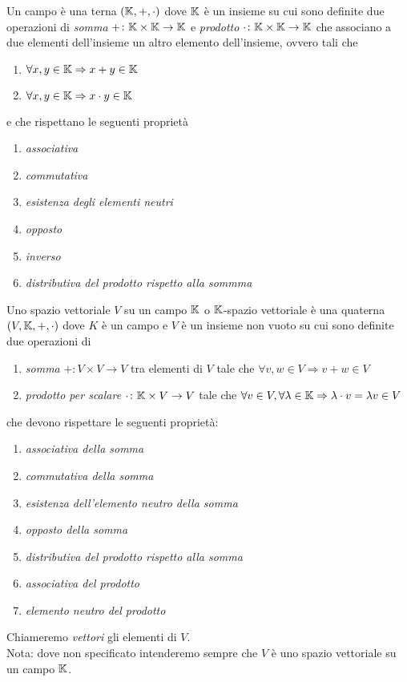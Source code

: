 


\begin{definition}[Campo]
	Un campo è una terna $ (\mathbb{K}, +, \cdot) $ dove $ \mathbb{K} $ è un insieme su cui sono definite due operazioni di \emph{somma} $ + \colon \mathbb{K} \times \mathbb{K} \to \mathbb{K} $ e \emph{prodotto} $ \cdot \colon \mathbb{K} \times \mathbb{K} \to \mathbb{K} $ che associano a due elementi dell'insieme un altro elemento dell'insieme, ovvero tali che
	\begin{enumerate}
		\item $ \forall x, y \in \mathbb{K} \Rightarrow x + y \in \mathbb{K} $
		\item $ \forall x, y \in \mathbb{K} \Rightarrow x \cdot y \in \mathbb{K} $
	\end{enumerate}
	e che rispettano le seguenti proprietà
	\begin{enumerate}[label = (\roman*)]
		\item \emph{associativa}
		\item \emph{commutativa}
		\item \emph{esistenza degli elementi neutri}
		\item \emph{opposto}
		\item \emph{inverso}
		\item \emph{distributiva del prodotto rispetto alla sommma}
	\end{enumerate}
\end{definition}

\begin{definition}
	Uno spazio vettoriale $ V $ su un campo $ \mathbb{K} $ o $ \mathbb{K} $-spazio vettoriale è una quaterna $ (V, \mathbb{K}, +, \cdot) $ dove $ K $ è un campo e $ V $ è un insieme non vuoto su cui sono definite due operazioni di 
	\begin{enumerate}
		\item \emph{somma} $ + \colon V \times V \to V $ tra elementi di $ V $ tale che $ \forall v, w \in V \Rightarrow v + w \in V $
		\item \emph{prodotto per scalare} $ \cdot \colon \mathbb{K} \times V \to V $ tale che $ \forall v \in V, \forall \lambda \in \mathbb{K} \Rightarrow \lambda \cdot v = \lambda v \in V $
	\end{enumerate}
	che devono rispettare le seguenti proprietà:
	\begin{enumerate}[label=(\roman*)]
		\item \emph{associativa della somma}
		\item \emph{commutativa della somma}
		\item \emph{esistenza dell'elemento neutro della somma}
		\item \emph{opposto della somma}
		\item \emph{distributiva del prodotto rispetto alla somma}
		\item \emph{associativa del prodotto}
		\item \emph{elemento neutro del prodotto}
	\end{enumerate}
	Chiameremo \emph{vettori} gli elementi di $ V $. \\
	\textsf{Nota: dove non specificato intenderemo sempre che $ V $ è uno spazio vettoriale su un campo $ \mathbb{K} $.}
\end{definition}

